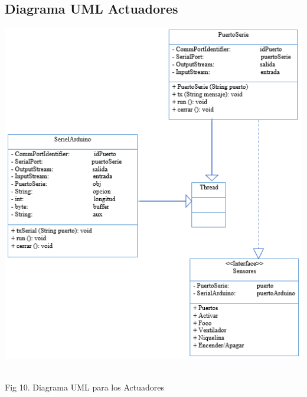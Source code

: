 \documentclass[12pt]{report}
\begin{document}
\subsection{Diagrama UML Actuadores}
 \begin{center}
\includegraphics[scale=0.58]{Documento/Figuras/fig10.PNG}
\begin{scriptsize}\\ 
Fig 10. Diagrama UML para los Actuadores
\end{scriptsize}
\end{center}
\end{document}
